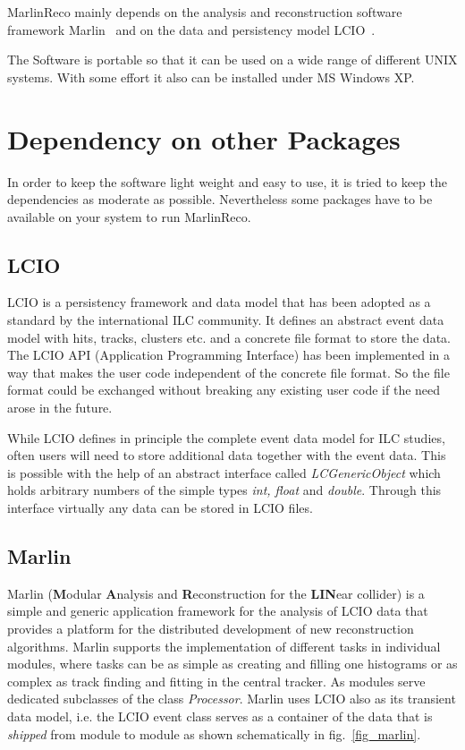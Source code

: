 MarlinReco mainly depends on the analysis and reconstruction 
software framework Marlin~\cite{ref_marlin} and on the data and persistency 
model LCIO~\cite{ref_lcio,ref_lciohome}.

The Software is portable so that it can be used on a wide range of 
different UNIX systems. With some effort it also can be installed under
MS Windows XP.  

\section{Dependency on other Packages}

In order to keep the software light weight and easy to use, 
it is tried to keep the dependencies as moderate as possible.
Nevertheless some packages have to be available on your system to run  
MarlinReco.

\subsection{LCIO}

LCIO is a persistency framework and data model that has been adopted as a
standard by the international ILC community. It defines an abstract event
data model with hits, tracks, clusters etc. and a concrete file format to
store the data. The LCIO API (Application Programming Interface)
has been implemented in a way that makes the user code
independent of the concrete file format. So the file format could be exchanged
without breaking any existing user code if the need arose in the future.

While LCIO defines in principle the complete event data model for ILC studies,
often users will need to store additional data together with the event data.
This is possible with the help of an abstract interface called
{\em LCGenericObject} which holds arbitrary numbers of the simple types
{\em int, float} and {\em double}. Through this interface virtually any data
can be stored in LCIO files.

\subsection{Marlin}

Marlin ({\bf M}odular {\bf A}nalysis and {\bf R}econstruction for the
{\bf LIN}ear collider) is a simple and generic
\CPP application framework for the analysis of LCIO data that provides a
platform for the distributed development of new reconstruction
algorithms. Marlin supports the implementation of different tasks in individual
modules, where tasks can be as simple as creating and filling one
histograms or as complex as track finding and fitting
in the central tracker. As modules serve dedicated subclasses of
the class {\em Processor}.
Marlin uses LCIO also as its transient data model, i.e.
the LCIO event class serves as a container of the data that is
{\em shipped} from module to module as shown schematically in 
fig.~\ref{fig_marlin}. 


